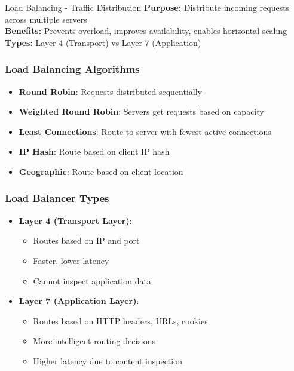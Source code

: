\documentclass[10pt,a4paper]{article}
\begin{document}
\begin{conceptbox}{Load Balancing - Traffic Distribution}
\textbf{Purpose:} Distribute incoming requests across multiple servers\\
\textbf{Benefits:} Prevents overload, improves availability, enables horizontal scaling\\
\textbf{Types:} Layer 4 (Transport) vs Layer 7 (Application)
\end{conceptbox}

\subsubsection{Load Balancing Algorithms}
\begin{itemize}
\item \textbf{Round Robin}: Requests distributed sequentially
\item \textbf{Weighted Round Robin}: Servers get requests based on capacity
\item \textbf{Least Connections}: Route to server with fewest active connections
\item \textbf{IP Hash}: Route based on client IP hash
\item \textbf{Geographic}: Route based on client location
\end{itemize}

\subsubsection{Load Balancer Types}
\begin{itemize}
\item \textbf{Layer 4 (Transport Layer)}:
  \begin{itemize}
  \item Routes based on IP and port
  \item Faster, lower latency
  \item Cannot inspect application data
  \end{itemize}
\item \textbf{Layer 7 (Application Layer)}:
  \begin{itemize}
  \item Routes based on HTTP headers, URLs, cookies
  \item More intelligent routing decisions
  \item Higher latency due to content inspection
  \end{itemize}
\end{itemize}
\end{document}
